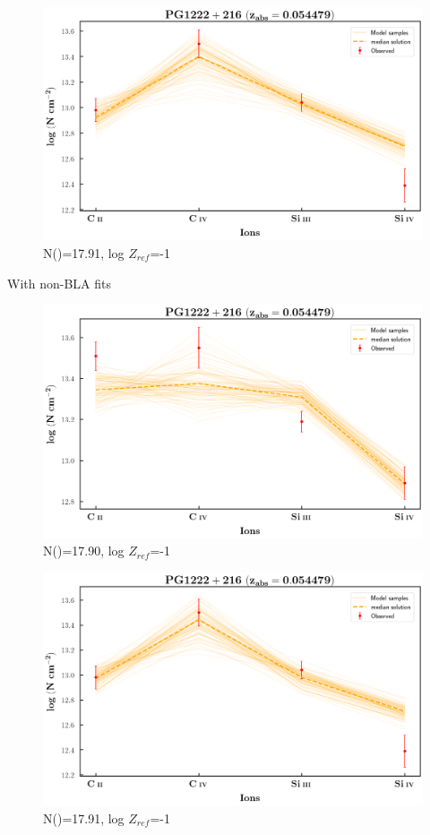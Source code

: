 \documentclass[12pt]{report}
\newcommand\ion[2]{\text{#1\,\textsc{\lowercase{#2}}}}
\begin{document}
\newpage

\begin{figure}[!h]
    \centering
    \includegraphics[width=0.8\linewidth]{Ionisation-Modelling-Plots/pg1222-z=0.054479-compII_logZ=-1.png}
    \caption{N(\ion{H}{i})=17.91, log $Z_{ref}$=-1}
\end{figure}

With non-BLA fits

\begin{figure}[!b]
    \centering
    \includegraphics[width=0.8\linewidth]{Ionisation-Modelling-Plots/pg1222-z=0.054479-compIII_logZ=-1.png}
    \caption{N(\ion{H}{i})=17.90, log $Z_{ref}$=-1}
\end{figure}

\begin{figure}[!t]
    \centering
    \includegraphics[width=1\linewidth]{Ionisation-Modelling-Plots/pg1222-z=0.054479-compIV_logZ=-1.png}
    \caption{N(\ion{H}{i})=17.91, log $Z_{ref}$=-1}
\end{figure}
\end{document}
